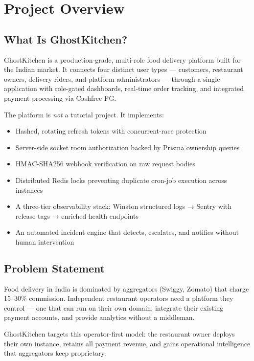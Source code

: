 \documentclass[11pt,a4paper,twoside]{book}
\begin{document}
\chapter{Project Overview}

\section{What Is GhostKitchen?}

GhostKitchen is a production-grade, multi-role food delivery platform built for
the Indian market.  It connects four distinct user types — customers, restaurant
owners, delivery riders, and platform administrators — through a single
application with role-gated dashboards, real-time order tracking, and integrated
payment processing via Cashfree PG.

The platform is \emph{not} a tutorial project.  It implements:

\begin{itemize}[leftmargin=1.4em]
  \item Hashed, rotating refresh tokens with concurrent-race protection
  \item Server-side socket room authorization backed by Prisma ownership queries
  \item HMAC-SHA256 webhook verification on raw request bodies
  \item Distributed Redis locks preventing duplicate cron-job execution across instances
  \item A three-tier observability stack: Winston structured logs → Sentry with release tags → enriched health endpoints
  \item An automated incident engine that detects, escalates, and notifies without human intervention
\end{itemize}

\section{Problem Statement}

Food delivery in India is dominated by aggregators (Swiggy, Zomato) that charge
15–30\% commission.  Independent restaurant operators need a platform they
control — one that can run on their own domain, integrate their existing payment
accounts, and provide analytics without a middleman.

GhostKitchen targets this operator-first model: the restaurant owner deploys
their own instance, retains all payment revenue, and gains operational
intelligence that aggregators keep proprietary.
\end{document}
